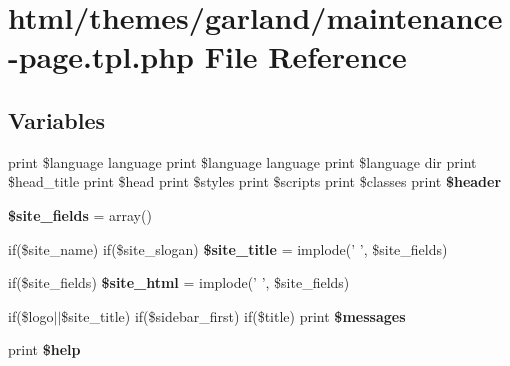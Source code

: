 \hypertarget{themes_2garland_2maintenance-page_8tpl_8php}{
\section{html/themes/garland/maintenance-\/page.tpl.php File Reference}
\label{themes_2garland_2maintenance-page_8tpl_8php}
}
\subsection*{Variables}
\begin{DoxyCompactItemize}
\item 
\hypertarget{themes_2garland_2maintenance-page_8tpl_8php_adb27e30fad2178c85e7e42beb5ba031d}{
print \$language language print \$language language print \$language dir print \$head\_\-title print \$head print \$styles print \$scripts print \$classes print {\bfseries \$header}}
\label{themes_2garland_2maintenance-page_8tpl_8php_adb27e30fad2178c85e7e42beb5ba031d}

\item 
\hypertarget{themes_2garland_2maintenance-page_8tpl_8php_ab85440d44aac8e0486256cf11b14a27f}{
{\bfseries \$site\_\-fields} = array()}
\label{themes_2garland_2maintenance-page_8tpl_8php_ab85440d44aac8e0486256cf11b14a27f}

\item 
\hypertarget{themes_2garland_2maintenance-page_8tpl_8php_abbc4f09798404930ee188927ceccb4a9}{
if(\$site\_\-name) if(\$site\_\-slogan) {\bfseries \$site\_\-title} = implode(' ', \$site\_\-fields)}
\label{themes_2garland_2maintenance-page_8tpl_8php_abbc4f09798404930ee188927ceccb4a9}

\item 
\hypertarget{themes_2garland_2maintenance-page_8tpl_8php_ac3aa0e93889edb67c3f21d14cdc2271a}{
if(\$site\_\-fields) {\bfseries \$site\_\-html} = implode(' ', \$site\_\-fields)}
\label{themes_2garland_2maintenance-page_8tpl_8php_ac3aa0e93889edb67c3f21d14cdc2271a}

\item 
\hypertarget{themes_2garland_2maintenance-page_8tpl_8php_a32a2ff358977168f16c6d7a9b9bcd284}{
if(\$logo$|$$|$\$site\_\-title) if(\$sidebar\_\-first) if(\$title) print {\bfseries \$messages}}
\label{themes_2garland_2maintenance-page_8tpl_8php_a32a2ff358977168f16c6d7a9b9bcd284}

\item 
\hypertarget{themes_2garland_2maintenance-page_8tpl_8php_aba6844125e75e2a6f95f76b8e833b8d3}{
print {\bfseries \$help}}
\label{themes_2garland_2maintenance-page_8tpl_8php_aba6844125e75e2a6f95f76b8e833b8d3}

\end{DoxyCompactItemize}


